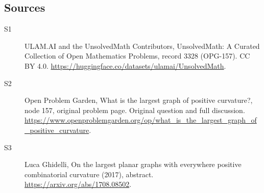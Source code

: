 \documentclass[11pt]{article}
\begin{document}
\subsection{Sources}
\begin{description}
\item[\hypertarget{source:3328:1}{S1}] ULAM.AI and the UnsolvedMath Contributors, UnsolvedMath: A Curated Collection of Open Mathematics Problems, record 3328 (OPG-157). CC BY 4.0. \url{https://huggingface.co/datasets/ulamai/UnsolvedMath}.
\item[\hypertarget{source:3328:2}{S2}] Open Problem Garden, What is the largest graph of positive curvature?, node 157, original problem page. Original question and full discussion. \url{https://www.openproblemgarden.org/op/what_is_the_largest_graph_of_positive_curvature}.
\item[\hypertarget{source:3328:3}{S3}] Luca Ghidelli, On the largest planar graphs with everywhere positive combinatorial curvature (2017), abstract. \url{https://arxiv.org/abs/1708.08502}.
\end{description}
\label{end:3328}
\end{document}
